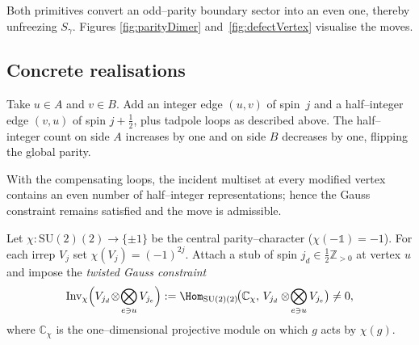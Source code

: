 \documentclass[11pt]{article}
\newcommand{\SU}{\mathrm{SU}(2)}
\newcommand{\Inv}{\mathrm{Inv}}
\newcommand{\Cut}{\gamma}
\begin{document}
Both primitives convert an odd–parity boundary sector into an even one,
thereby unfreezing $S_\Cut$.  Figures \ref{fig:parityDimer}
and~\ref{fig:defectVertex} visualise the moves.

\subsection*{Concrete realisations}

\begin{example}\label{ex:paritydimer}
Take $u\in A$ and $v\in B$.  Add an integer edge $(u,v)$ of spin~$j$ and a
half–integer edge $(v,u)$ of spin $j+\tfrac12$, plus tadpole loops as
described above.  The half–integer count on side $A$ increases by one and
on side $B$ decreases by one, flipping the global parity.
\end{example}

\begin{lemma}\label{lem:dimerGauge}
With the compensating loops, the incident multiset at every modified
vertex contains an even number of half–integer representations; hence
the Gauss constraint remains satisfied and the move is admissible.
\end{lemma}

\begin{definition}\label{def:defectAdmissible}
Let \(\chi:\SU(2)\!\to\!\{\pm1\}\) be the central parity–character
(\(\chi(-\mathbb1)=-1\)).  
For each irrep \(V_j\) set \(\chi(V_j)=(-1)^{2j}\).
Attach a stub of spin \(j_d\in\tfrac12\mathbb Z_{>0}\) at vertex \(u\) and
impose the \emph{twisted Gauss constraint}
\[
  \Inv_{\chi}\Bigl(
     V_{j_d}\!\otimes\!\bigotimes_{e\ni u} V_{j_e}
  \Bigr)
  :=\Hom_{\SU(2)}\!\bigl(
       \mathbb C_{\chi},\,
       V_{j_d}\otimes\!\bigotimes_{e\ni u} V_{j_e}
     \bigr)\neq0,
\]
where \(\mathbb C_{\chi}\) is the one–dimensional projective module on
which \(g\) acts by \(\chi(g)\).
\end{definition}
\end{document}

